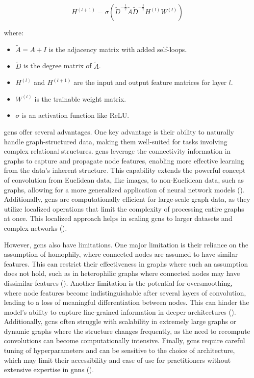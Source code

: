 \[ H^{(l+1)} = \sigma\left(\tilde{D}^{-\frac{1}{2}}\tilde{A}\tilde{D}^{-\frac{1}{2}} H^{(l)} W^{(l)}\right) \]

where:
\begin{itemize}
    \item \( \tilde{A} = A + I \) is the adjacency matrix with added self-loops.
    \item \( \tilde{D} \) is the degree matrix of \( \tilde{A} \).
    \item \( H^{(l)} \) and \( H^{(l+1)} \) are the input and output feature matrices for layer \( l \).
    \item \( W^{(l)} \) is the trainable weight matrix.
    \item \( \sigma \) is an activation function like ReLU.
\end{itemize}

\glspl{gcn} offer several advantages.
One key advantage is their ability to naturally handle graph-structured data, making them well-suited for tasks involving complex relational structures.
\glspl{gcn} leverage the connectivity information in graphs to capture and propagate node features, enabling more effective learning from the data's inherent structure.
This capability extends the powerful concept of convolution from Euclidean data, like images, to non-Euclidean data, such as graphs, allowing for a more generalized application of neural network models (\cite{Wu2021}).
Additionally, \glspl{gcn} are computationally efficient for large-scale graph data, as they utilize localized operations that limit the complexity of processing entire graphs at once.
This localized approach helps in scaling \glspl{gcn} to larger datasets and complex networks (\cite{Li2018}).

However, \glspl{gcn} also have limitations.
One major limitation is their reliance on the assumption of homophily, where connected nodes are assumed to have similar features.
This can restrict their effectiveness in graphs where such an assumption does not hold, such as in heterophilic graphs where connected nodes may have dissimilar features (\cite{Xu2019}).
Another limitation is the potential for oversmoothing, where node features become indistinguishable after several layers of convolution, leading to a loss of meaningful differentiation between nodes.
This can hinder the model's ability to capture fine-grained information in deeper architectures (\cite{Li2018}).
Additionally, \glspl{gcn} often struggle with scalability in extremely large graphs or dynamic graphs where the structure changes frequently, as the need to recompute convolutions can become computationally intensive.
Finally, \glspl{gcn} require careful tuning of hyperparameters and can be sensitive to the choice of architecture, which may limit their accessibility and ease of use for practitioners without extensive expertise in \glspl{gnn} (\cite{Wu2021}).

